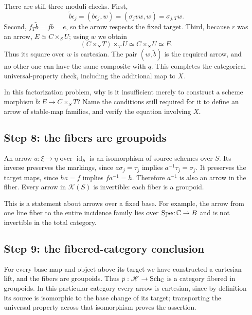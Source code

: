 There are still three moduli checks. First,
\[
 \widetilde b\epsilon_j=(b\epsilon_j,w)
      =(\sigma_jvw,w)=\sigma_{j,T}w.
\]
Second, $f_T\widetilde b=fb=e$, so the arrow respects the fixed target. Third, because $r$ was an arrow, $E\simeq C\times_S U$; using $w$ we obtain
\[
 (C\times_S T)\times_T U\simeq C\times_S U\simeq E.
\]
Thus its square over $w$ is cartesian. The pair $(w,\widetilde b)$ is the required arrow, and no other one can have the same composite with $q$. This completes the categorical universal-property check, including the additional map to $X$.

\begin{Ej}\label{maps:ex-cartesian}
In this factorization problem, why is it insufficient merely to construct a scheme morphism $\widetilde b:E\to C\times_S T$? Name the conditions still required for it to define an arrow of stable-map families, and verify the equation involving $X$.
\end{Ej}

\subsection{Step 8: the fibers are groupoids}

An arrow $a:\xi\to\eta$ over $\operatorname{id}_S$ is an isomorphism of source schemes over $S$. Its inverse preserves the markings, since $a\sigma_j=\tau_j$ implies $a^{-1}\tau_j=\sigma_j$. It preserves the target maps, since $ha=f$ implies $fa^{-1}=h$. Therefore $a^{-1}$ is also an arrow in the fiber. Every arrow in $\mathscr K(S)$ is invertible: each fiber is a groupoid.

This is a statement about arrows over a fixed base. For example, the arrow from one line fiber to the entire incidence family lies over $\operatorname{Spec}\mathbb C\to B$ and is not invertible in the total category.

\subsection{Step 9: the fibered-category conclusion}

For every base map and object above its target we have constructed a cartesian lift, and the fibers are groupoids. Thus $p:\mathscr K\to\operatorname{Sch}_{\mathbb C}$ is a category fibered in groupoids. In this particular category every arrow is cartesian, since by definition its source is isomorphic to the base change of its target; transporting the universal property across that isomorphism proves the assertion.

